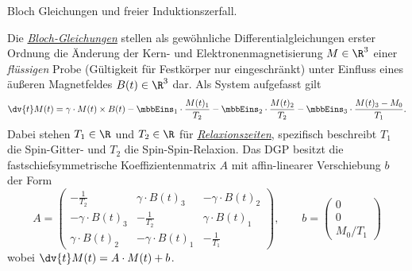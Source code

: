 \documentclass{subfiles}
\begin{document}
    \begin{Frage}
        Bloch Gleichungen und freier Induktionszerfall.
    \end{Frage}
    \begin{Antwort}
        Die \href{}{\emph{Bloch-Gleichungen}} stellen als gewöhnliche Differentialgleichungen erster Ordnung die Änderung der Kern- und Elektronenmagnetisierung $M\in\R^3$ einer \emph{flüssigen} Probe (Gültigkeit für Festkörper nur eingeschränkt) unter Einfluss eines äußeren Magnetfeldes $B(t)\in\R^3$ dar. Als System aufgefasst gilt 
        \[
            \dv{t}M(t) = \gamma\cdot M(t)\times B(t) - \mbbEins_1\cdot\frac{M(t)_1}{T_2} - \mbbEins_2\cdot\frac{M(t)_2}{T_2} - \mbbEins_3\cdot\frac{M(t)_3 - M_0}{T_1}.
        \]
        Dabei stehen $T_1\in\R$ und $T_2\in\R$ für \href{}{\emph{Relaxionszeiten}}, spezifisch beschreibt $T_1$ die Spin-Gitter- und $T_2$ die Spin-Spin-Relaxion. Das DGP besitzt die fastschiefsymmetrische Koeffizientenmatrix $A$ mit affin-linearer Verschiebung $b$ der Form
        \[
            A = \begin{pmatrix}
                -\frac{1}{T_2} & \gamma\cdot B(t)_3 & -\gamma\cdot B(t)_2 \\
                -\gamma\cdot B(t)_3 & -\frac{1}{T_2} & \gamma\cdot B(t)_1 \\
                \gamma\cdot B(t)_2 & -\gamma\cdot B(t)_1 & -\frac{1}{T_1}
            \end{pmatrix},\qquad b = \begin{pmatrix}
                0\\
                0\\
                M_0/T_1
            \end{pmatrix}
        \]
        wobei $\dv{t}M(t) = A\cdot M(t) + b$. \\

        
    \end{Antwort}
\end{document}
